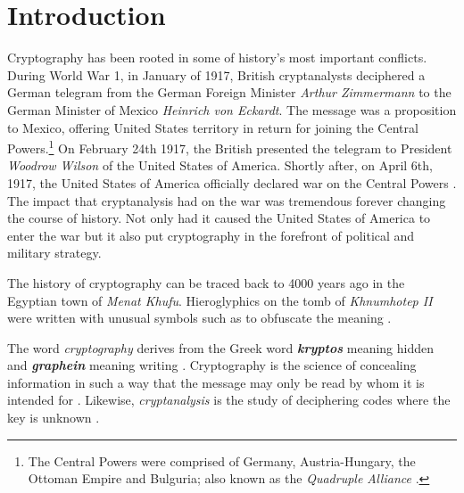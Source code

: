 \chapter{Introduction} %
\label{Introduction} %


\newcommand{\keyword}[1]{\textbf{#1}}
\newcommand{\tabhead}[1]{\textbf{#1}}
\newcommand{\code}[1]{\texttt{#1}}
\newcommand{\file}[1]{\texttt{\bfseries#1}}
\newcommand{\option}[1]{\texttt{\itshape#1}}


Cryptography has been rooted in some of history's most important conflicts. 
During World War 1, in January of 1917, British cryptanalysts deciphered a German
telegram from the German Foreign Minister \textit{Arthur Zimmermann} to the German Minister
of Mexico \textit{Heinrich von Eckardt}. The message was a proposition to Mexico, offering
United States territory in return for joining the Central Powers.\footnote{The Central Powers 
were comprised of Germany, Austria-Hungary, the Ottoman Empire and Bulguria; also known as
the \textit{Quadruple Alliance} \cite{wiki:central_powers}.} On February 24th 1917, the British
presented the telegram to President \textit{Woodrow Wilson} of the United States of America. 
Shortly after, on April 6th, 1917, the United States of America officially declared war
on the Central Powers \cite{the_zimmermann_telegram}. The impact that cryptanalysis had on
the war was tremendous forever changing the course of history. Not only had it caused the
United States of America to enter the war but it also put cryptography in the forefront of political
and military strategy. 

The history of cryptography can be traced back to 4000 years ago in the Egyptian town of 
\textit{Menat Khufu}. Hieroglyphics on the tomb of \textit{Khnumhotep II} were written with unusual 
symbols such as to obfuscate the meaning \cite{history_of_cryptography}. 

The word \textit{cryptography} derives from the Greek word \textbf{\textit{kryptos}}
meaning hidden and \textbf{\textit{graphein}} meaning writing \cite{pawlan_cryptography}.
Cryptography is the science of concealing information in such a way that the message
may only be read by whom it is intended for \cite{cryptography_definition}. 
Likewise, \textit{cryptanalysis} is the study of deciphering codes where the key is unknown 
\cite{cryptanalysis_definition}.  

